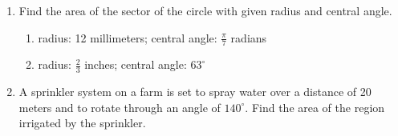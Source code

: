 \documentclass[12pt]{article}
\newif\ifans
\begin{document}
\begin{enumerate}
\item Find the area of the sector of the circle with given radius and central angle.

\begin{enumerate}

\item radius: 12 millimeters; central angle: $\displaystyle \frac{\pi}{7}$ radians

\ifans \fbox{$\displaystyle \frac{72\pi}{7}$ square millimeters} \fi

\item radius: $\displaystyle \frac{2}{3}$ inches; central angle: $63^{\circ}$

\ifans \fbox{$\displaystyle \frac{7\pi}{90}$ square inches} \fi

\end{enumerate}

\item A sprinkler system on a farm is set to spray water over a distance of 20 meters and to rotate through an angle of $140^{\circ}$.  Find the area of the region irrigated by the sprinkler.

\ifans \fbox{$\displaystyle \frac{1400\pi}{9}$ square meters}\fi


\end{enumerate}
\end{document}
